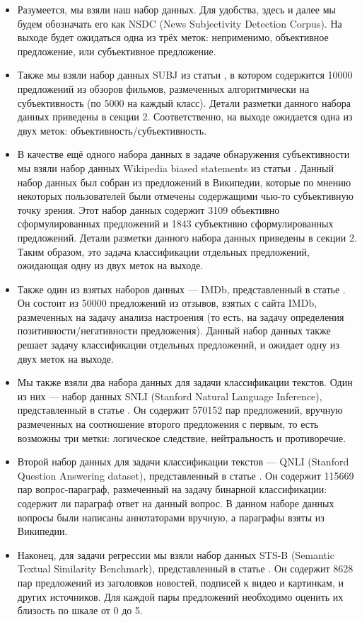 \documentclass[a4paper,14pt]{extarticle}
\begin{document}
    \begin{itemize}
        \item Разумеется, мы взяли наш набор данных. Для удобства, здесь и далее мы будем обозначать его как NSDC (News Subjectivity Detection Corpus). На выходе будет ожидаться одна из трёх меток: неприменимо, объективное предложение, или субъективное предложение.
        \item Также мы взяли набор данных SUBJ из статьи \cite{subj}, в котором содержится 10000 предложений из обзоров фильмов, размеченных алгоритмически на субъективность (по 5000 на каждый класс). Детали разметки данного набора данных приведены в секции 2. Соответственно, на выходе ожидается одна из двух меток: объективность/субъективность.
        \item В качестве ещё одного набора данных в задаче обнаружения субъективности мы взяли набор данных Wikipedia biased statements из статьи \cite{wikipedia-biased-statements}. Данный набор данных был собран из предложений в Википедии, которые по мнению некоторых пользователей были отмечены содержащими чью-то субъективную точку зрения. Этот набор данных содержит 3109 объективно сформулированных предложений и 1843 субъективно сформулированных предложений. Детали разметки данного набора данных приведены в секции 2. Таким образом, это задача классификации отдельных предложений, ожидающая одну из двух меток на выходе.
        \item Также один из взятых наборов данных --- IMDb, представленный в статье \cite{imdb}. Он состоит из 50000 предложений из отзывов, взятых с сайта IMDb, размеченных на задачу анализа настроения (то есть, на задачу определения позитивности/негативности предложения). Данный набор данных также решает задачу классификации отдельных предложений, и ожидает одну из двух меток на выходе.
        \item Мы также взяли два набора данных для задачи классификации текстов. Один из них --- набор данных SNLI (Stanford Natural Language Inference), представленный в статье \cite{snli}. Он содержит 570152 пар предложений, вручную размеченных на соотношение второго предложения с первым, то есть возможны три метки: логическое следствие, нейтральность и противоречие.
        \item Второй набор данных для задачи классификации текстов --- QNLI (Stanford Question Answering dataset), представленный в статье \cite{qnli}. Он содержит 115669 пар вопрос-параграф, размеченный на задачу бинарной классификации: содержит ли параграф ответ на данный вопрос. В данном наборе данных вопросы были написаны аннотаторами вручную, а параграфы взяты из Википедии.
        \item Наконец, для задачи регрессии мы взяли набор данных STS-B (Semantic Textual Similarity Benchmark), представленный в статье \cite{sts-b}. Он содержит 8628 пар предложений из заголовков новостей, подписей к видео и картинкам, и других источников. Для каждой пары предложений необходимо оценить их близость по шкале от 0 до 5. 
    \end{itemize}
    
\end{document}
